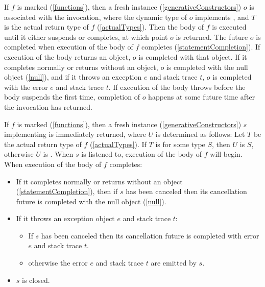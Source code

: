 \documentclass[makeidx]{article}
\begin{document}
{\LMHash{}%
If $f$ is marked \ASYNC{} (\ref{functions}),
then a fresh instance (\ref{generativeConstructors}) $o$ is associated with the invocation,
where the dynamic type of $o$ implements ,
and $T$ is the actual return type of $f$ (\ref{actualTypes}).
Then the body of $f$ is executed until it either suspends or completes, at which point $o$ is returned.
The future $o$ is completed when execution of the body of $f$ completes (\ref{statementCompletion}).
If execution of the body returns an object, $o$ is completed with that object.
If it completes normally or returns without an object,
$o$ is completed with the null object (\ref{null}),
and if it throws an exception $e$ and stack trace $t$,
$o$ is completed with the error $e$ and stack trace $t$.
If execution of the body throws before the body suspends the first time,
completion of $o$ happens at some future time after the invocation has returned.

\LMHash{}%
If $f$ is marked \code{\ASYNC*} (\ref{functions}),
then a fresh instance (\ref{generativeConstructors}) $s$
implementing  is immediately returned,
where $U$ is determined as follows:
Let $T$ be the actual return type of $f$ (\ref{actualTypes}).
If $T$ is  for some type $S$, then $U$ is $S$,
otherwise $U$ is .
When $s$ is listened to, execution of the body of $f$ will begin.
When execution of the body of $f$ completes:
\begin{itemize}
\item If it completes normally or returns without an object
  (\ref{statementCompletion}),
  then if $s$ has been canceled
  then its cancellation future is completed with the null object (\ref{null}).
\item If it throws an exception object $e$ and stack trace $t$:
  \begin{itemize}
  \item If $s$ has been canceled then its cancellation future is completed with error $e$ and stack trace $t$.
  \item otherwise the error $e$ and stack trace $t$ are emitted by $s$.
  \end{itemize}
\item $s$ is closed.
\end{itemize}

}
\end{document}
